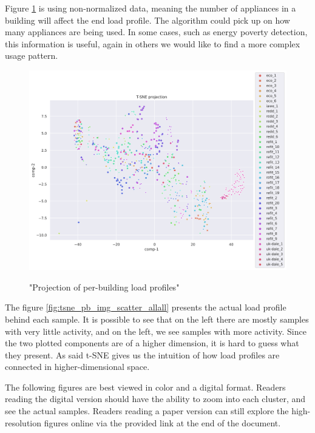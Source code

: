 Figure \ref{fig:tsne_scatter_non_norm_all} is using non-normalized data, meaning
the number of appliances in a building will affect the end load profile.
The algorithm could pick up on how many appliances are being used.
In some cases, such as energy poverty detection, this information is useful, 
again in others we would like to find a more complex usage pattern.

\begin{figure}[H]
	\centering
	\caption{"Projection of per-building load profiles"}
	\includegraphics[width=1.2\textwidth]{Figures/TSNE/TSNE_per_building/non_norm/scatter_non_norm_all.png}
	\label{fig:tsne_scatter_non_norm_all}
\end{figure}

The figure \ref{fig:tsne_pb_img_scatter_allall} presents the actual load profile behind each sample. 
It is possible to see that on the left there are mostly samples with very little activity,
and on the left, we see samples with more activity.
Since the two plotted components are of a higher dimension, it is hard to guess what they present.
As said t-SNE gives us the intuition of how load profiles are connected in higher-dimensional space.

The following figures are best viewed in color and a digital format. 
Readers reading the digital version should have the ability to zoom into each cluster, and see the actual samples. 
Readers reading a paper version can still explore the high-resolution figures online via the provided link at the end of the document.

